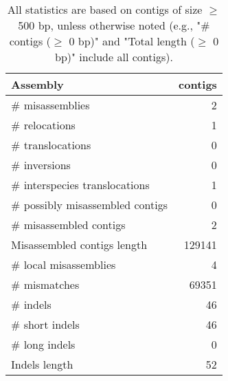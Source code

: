 \documentclass[12pt,a4paper]{article}
\begin{document}
\begin{table}[ht]
\begin{center}
\caption{All statistics are based on contigs of size $\geq$ 500 bp, unless otherwise noted (e.g., "\# contigs ($\geq$ 0 bp)" and "Total length ($\geq$ 0 bp)" include all contigs).}
\begin{tabular}{|l*{1}{|r}|}
\hline
Assembly & contigs \\ \hline
\# misassemblies & 2 \\ \hline
\hspace{5mm}\# relocations & 1 \\ \hline
\hspace{5mm}\# translocations & 0 \\ \hline
\hspace{5mm}\# inversions & 0 \\ \hline
\hspace{5mm}\# interspecies translocations & 1 \\ \hline
\# possibly misassembled contigs & 0 \\ \hline
\# misassembled contigs & 2 \\ \hline
Misassembled contigs length & 129141 \\ \hline
\# local misassemblies & 4 \\ \hline
\# mismatches & 69351 \\ \hline
\# indels & 46 \\ \hline
\hspace{5mm}\# short indels & 46 \\ \hline
\hspace{5mm}\# long indels & 0 \\ \hline
Indels length & 52 \\ \hline
\end{tabular}
\end{center}
\end{table}
\end{document}
